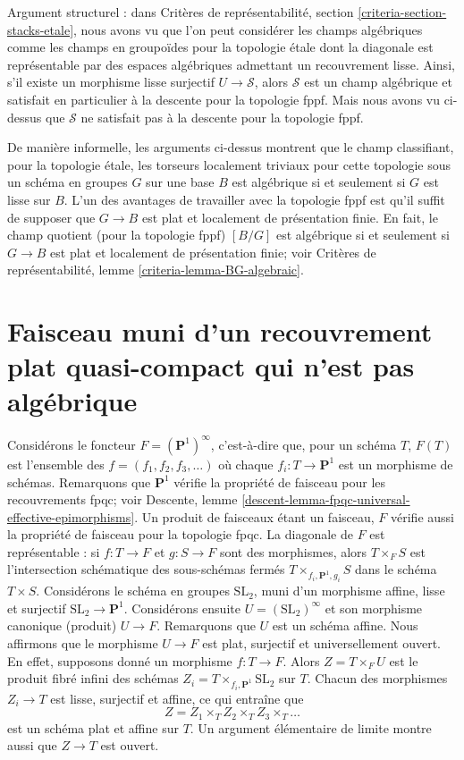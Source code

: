 \medskip\noindent
Argument structurel : dans
Critères de représentabilité, section \ref{criteria-section-stacks-etale},
nous avons vu que l'on peut considérer les champs algébriques comme les
champs en groupoïdes pour la topologie étale dont la diagonale est
représentable par des espaces algébriques admettant un recouvrement lisse.
Ainsi, s'il existe un morphisme lisse surjectif $U \to \mathcal{S}$, alors
$\mathcal{S}$ est un champ algébrique et satisfait en particulier à la
descente pour la topologie fppf. Mais nous avons vu ci-dessus que $\mathcal{S}$
ne satisfait pas à la descente pour la topologie fppf.

\medskip\noindent
De manière informelle, les arguments ci-dessus montrent que le champ classifiant,
pour la topologie étale, les torseurs localement triviaux pour cette topologie
sous un schéma en groupes $G$ sur une base $B$ est algébrique si et seulement
si $G$ est lisse sur $B$. L'un des avantages de travailler avec
la topologie fppf est qu'il suffit de supposer que $G \to B$
est plat et localement de présentation finie. En fait, le champ quotient
(pour la topologie fppf) $[B/G]$ est algébrique si et seulement
si $G \to B$ est plat et localement de présentation finie; voir
Critères de représentabilité, lemme \ref{criteria-lemma-BG-algebraic}.







\section{Faisceau muni d'un recouvrement plat quasi-compact qui n'est pas algébrique}
\label{section-not-algebraic}

\noindent
Considérons le foncteur $F = (\mathbf{P}^1)^\infty$, c'est-à-dire que, pour un schéma $T$,
$F(T)$ est l'ensemble des $f = (f_1, f_2, f_3, \ldots)$ où chaque
$f_i : T \to \mathbf{P}^1$ est un morphisme de schémas. Remarquons que
$\mathbf{P}^1$ vérifie la propriété de faisceau pour les recouvrements fpqc; voir
Descente, lemme \ref{descent-lemma-fpqc-universal-effective-epimorphisms}.
Un produit de faisceaux étant un faisceau, $F$ vérifie aussi la propriété de faisceau pour
la topologie fpqc. La diagonale de $F$ est représentable : si $f : T \to F$
et $g : S \to F$ sont des morphismes, alors $T \times_F S$ est l'intersection schématique
des sous-schémas fermés $T \times_{f_i, \mathbf{P}^1, g_i} S$
dans le schéma $T \times S$. Considérons le schéma en groupes $\text{SL}_2$, muni
d'un morphisme affine, lisse et surjectif $\text{SL}_2 \to \mathbf{P}^1$.
Considérons ensuite $U = (\text{SL}_2)^\infty$ et son morphisme canonique (produit)
$U \to F$. Remarquons que $U$ est un schéma affine. Nous affirmons que le morphisme
$U \to F$ est plat, surjectif et universellement ouvert. En effet, supposons donné
un morphisme $f : T \to F$. Alors $Z = T \times_F U$ est le produit fibré infini
des schémas $Z_i = T \times_{f_i, \mathbf{P}^1} \text{SL}_2$
sur $T$. Chacun des morphismes $Z_i \to T$ est lisse, surjectif et
affine, ce qui entraîne que
$$
Z = Z_1 \times_T Z_2 \times_T Z_3 \times_T \ldots
$$
est un schéma plat et affine sur $T$. Un argument élémentaire de limite montre aussi que
$Z \to T$ est ouvert.

